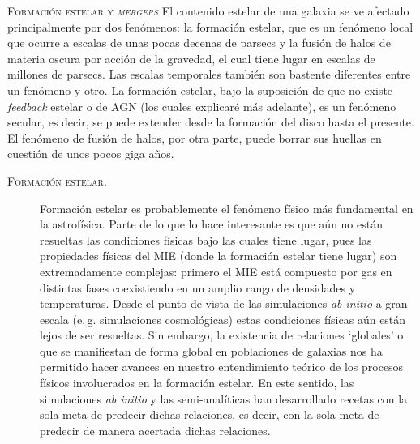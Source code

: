 \documentclass[xcolor=dvipsnames,4pt,hyperref={colorlinks,citecolor=black,linkcolor=black,urlcolor=black}]{beamer}
\begin{document}
\begin{frame}[allowframebreaks]{\textsc{Formación estelar y \emph{mergers}}}
%
El contenido estelar de una galaxia se ve afectado principalmente por dos fenómenos: la formación
estelar, que es un fenómeno local que ocurre a escalas de unas pocas decenas de parsecs y la fusión
de halos de materia oscura por acción de la gravedad, el cual tiene lugar en escalas de millones de
parsecs. Las escalas temporales también son bastente diferentes entre un fenómeno y otro. La
formación estelar, bajo la suposición de que no existe \emph{feedback} estelar o de AGN (los cuales
explicaré más adelante), es un fenómeno secular, es decir, se puede extender desde la formación del
disco hasta el presente. El fenómeno de fusión de halos, por otra parte, puede borrar sus huellas en
cuestión de unos pocos giga años.

\begin{description}
%
\item[\textsc{Formación estelar.}] Formación estelar es probablemente el fenómeno físico más
fundamental en la astrofísica. Parte de lo que lo hace interesante es que aún no están resueltas las
condiciones físicas bajo las cuales tiene lugar, pues las propiedades físicas del MIE (donde la
formación estelar tiene lugar) son extremadamente complejas: primero el MIE está compuesto por gas
en distintas fases coexistiendo en un amplio rango de densidades y temperaturas. Desde el punto de
vista de las simulaciones \emph{ab initio} a gran escala (e.\,g. simulaciones cosmológicas) estas
condiciones físicas aún están lejos de ser resueltas. Sin embargo, la existencia de relaciones
`globales' o que se manifiestan de forma global en poblaciones de galaxias nos ha permitido hacer
avances en nuestro entendimiento teórico de los procesos físicos involucrados en la formación
estelar. En este sentido, las simulaciones \emph{ab initio} y las semi-analíticas han desarrollado
recetas con la sola meta de predecir dichas relaciones, es decir, con la sola meta de predecir de
manera acertada dichas relaciones.


\end{description}
\end{frame}
\end{document}
